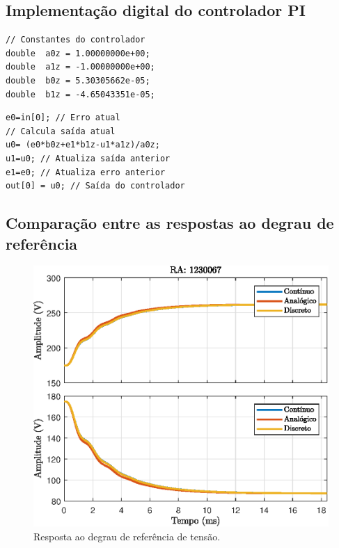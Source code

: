 \subsection{Implementação digital do controlador PI}


\begin{lstlisting}[caption={Parâmetros do controlador PI digital de tensão.},label={lst:valoresPI}]
// Constantes do controlador
double  a0z = 1.00000000e+00;
double  a1z = -1.00000000e+00;
double  b0z = 5.30305662e-05;
double  b1z = -4.65043351e-05;
\end{lstlisting}

\begin{lstlisting}[caption={Implementação do controlador PI digital de tensão.},label={lst:implementacaoPI}]
e0=in[0]; // Erro atual
// Calcula saída atual 
u0= (e0*b0z+e1*b1z-u1*a1z)/a0z; 
u1=u0; // Atualiza saída anterior
e1=e0; // Atualiza erro anterior    
out[0] = u0; // Saída do controlador
\end{lstlisting}


\subsection{Comparação entre as respostas ao degrau de referência}


\begin{figure}[!ht]
	\centering
	\includegraphics[width=0.9\linewidth]{Figs/Buck-BoostStepResponse1malhaTodos}
	\caption{Resposta ao degrau de referência de tensão.}
	\label{fig:Buck-BoostStepResponse1malhaTodos}
\end{figure}


